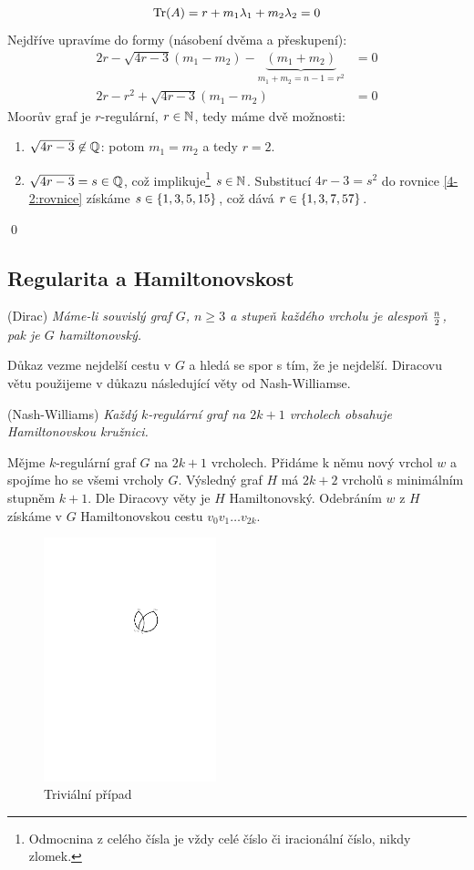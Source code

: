 \begin{align}
	\operatorname{Tr}(A) = r+m_1\lambda_1 + m_2\lambda_2 = 0
\end{align}
Nejdříve
upravíme do formy (násobení dvěma a přeskupení):
\begin{align}
	2r - \sqrt{4r-3}(m_1-m_2) - \underbrace{(m_1+m_2)}_{m_1+m_2=n-1=r^2} &= 0\\
	2r - r^2 + \sqrt{4r-3}(m_1 - m_2) &= 0
	\label{4-2:rovnice}
\end{align}
Moorův graf je $r$-regulární, $r\in\mathbb{N}$, tedy máme dvě možnosti:
\begin{enumerate}
	\item $\sqrt{4r-3} \not\in \mathbb{Q}$: potom $m_1 = m_2$ a tedy $r = 2$.
	\item $\sqrt{4r-3} = s \in \mathbb{Q}$, což implikuje\footnote{Odmocnina z celého čísla je
  vždy celé číslo či iracionální číslo, nikdy zlomek.} $s \in \mathbb{N}$.
  Substitucí $4r - 3 = s^2$ do rovnice \ref{4-2:rovnice} získáme
	$s \in \{1, 3, 5, 15\}$, což dává $r \in \{1, 3, 7, 57\}$.
\end{enumerate}
\qed


\subsection{Regularita a Hamiltonovskost}
\vt (Dirac) {\it Máme-li souvislý graf $G$, $n \ge 3$ a stupeň každého vrcholu je alespoň $n\over 2$, pak je $G$ hamiltonovský.}

Důkaz vezme nejdelší cestu v $G$ a hledá se spor s tím, že je nejdelší. Diracovu větu použijeme v důkazu následující věty od Nash-Williamse.

\vt (Nash-Williams) {\it Každý $k$-regulární graf na $2k+1$ vrcholech obsahuje Hamiltonovskou kružnici.}

\dk Mějme $k$-regulární graf $G$ na $2k+1$ vrcholech. Přidáme k němu nový vrchol $w$ a spojíme ho se všemi vrcholy $G$. Výsledný graf $H$ má $2k+2$ vrcholů s minimálním stupněm $k+1$. Dle Diracovy věty je $H$ Hamiltonovský. Odebráním $w$ z $H$ získáme v $G$ Hamiltonovskou cestu $v_0v_1\dots v_{2k}$.

\begin{figure}
\centering
\includegraphics[width=5cm]{img/nash-williams4.pdf}
\caption{Triviální případ}
\label{dk:nw-triv}
\end{figure}

